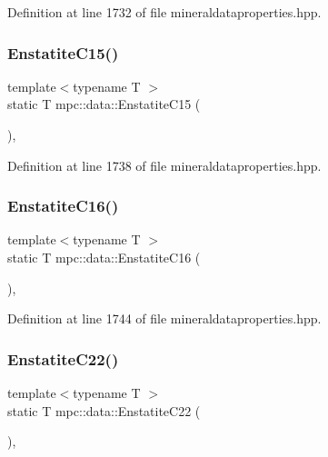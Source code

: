 Definition at line 1732 of file mineraldataproperties.\+hpp.

\mbox{\label{namespacempc_1_1data_a8dbeced0b3d3b080f6eca77b69f10253}} 
\subsubsection{\texorpdfstring{Enstatite\+C15()}{EnstatiteC15()}}
{\footnotesize\ttfamily template$<$typename T $>$ \\
static T mpc\+::data\+::\+Enstatite\+C15 (\begin{DoxyParamCaption}{ }\end{DoxyParamCaption})\hspace{0.3cm}{\ttfamily [inline]}, {\ttfamily [static]}}



Definition at line 1738 of file mineraldataproperties.\+hpp.

\mbox{\label{namespacempc_1_1data_aebee6503a9d061763c76fe2244e3715c}} 
\subsubsection{\texorpdfstring{Enstatite\+C16()}{EnstatiteC16()}}
{\footnotesize\ttfamily template$<$typename T $>$ \\
static T mpc\+::data\+::\+Enstatite\+C16 (\begin{DoxyParamCaption}{ }\end{DoxyParamCaption})\hspace{0.3cm}{\ttfamily [inline]}, {\ttfamily [static]}}



Definition at line 1744 of file mineraldataproperties.\+hpp.

\mbox{\label{namespacempc_1_1data_a8b340836157780822d34439e711a2656}} 
\subsubsection{\texorpdfstring{Enstatite\+C22()}{EnstatiteC22()}}
{\footnotesize\ttfamily template$<$typename T $>$ \\
static T mpc\+::data\+::\+Enstatite\+C22 (\begin{DoxyParamCaption}{ }\end{DoxyParamCaption})\hspace{0.3cm}{\ttfamily [inline]}, {\ttfamily [static]}}



